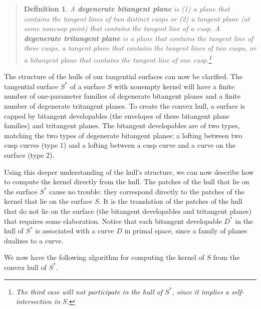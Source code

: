\documentclass[twoside]{article}
\newtheorem{definitionenv}{Definition}
\newenvironment{defn2}{\begin{quote}\begin{definitionenv}}%
                           {\end{definitionenv}\end{quote}}
\begin{document}
\begin{defn2}
A {\bf degenerate bitangent plane} is 
(1) a plane that contains the tangent lines of two distinct cusps or
(2) a tangent plane (at some noncusp point) that contains the tangent line of a cusp. 
A {\bf degenerate tritangent plane} is 
a plane that contains the tangent line of three cusps, 
a tangent plane that contains the tangent lines of two cusps,
or a bitangent plane that contains the tangent line of one cusp.\footnote{The
	third case will not participate in the hull of $S^*$, since
	it implies a self-intersection in $S$.}
\end{defn2}

The structure of the hulls of our tangential surfaces can now be clarified.
The tangential surface $S^*$ of a surface $S$ with nonempty kernel 
will have a finite number of one-parameter families of degenerate bitangent planes
and a finite number of degenerate tritangent planes.
To create the convex hull, a surface is capped by bitangent developables
(the envelopes of these bitangent plane families) and tritangent planes.
The bitangent developables
are of two types, matching the two types of degenerate bitangent planes: 
a lofting between two cusp curves (type 1) and
a lofting between a cusp curve and a curve on the surface (type 2).

Using this deeper understanding of the hull's structure,
we can now describe how to compute the kernel directly from the hull.
The patches of the hull that lie on the surface $S^*$
cause no trouble: they correspond directly
to the patches of the kernel that lie on the surface $S$.
It is the translation of the patches of the hull that do not lie on the surface 
(the bitangent developables and tritangent planes)
that requires some elaboration.
Notice that each bitangent developable $D^*$ in the hull of $S^*$ 
is associated with a curve $D$ in primal space, since a family of planes dualizes to a curve.

We now have the following algorithm for computing the kernel of $S$ 
from the convex hull of $S^*$.
\end{document}
